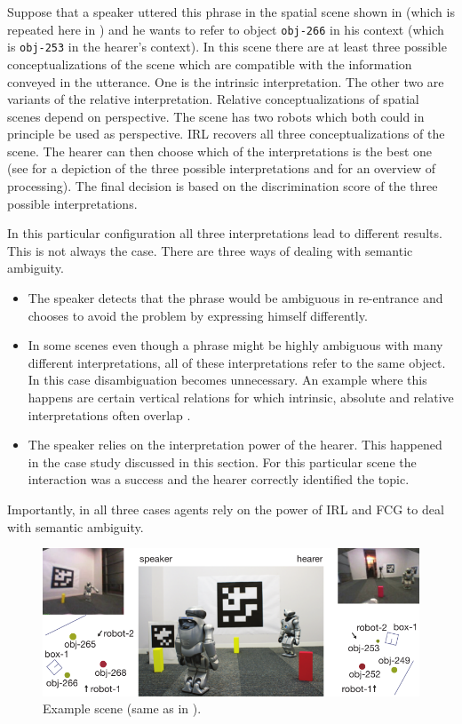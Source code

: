 Suppose that a speaker uttered this phrase in the spatial scene 
shown in  (which is repeated here in ) and he wants to refer to object {\footnotesize\tt obj-266} in his context (which
is {\footnotesize\tt obj-253} in the hearer's context). 
In this scene there are at least three possible conceptualizations of the
scene which are compatible with the information conveyed in the utterance. 
One is the intrinsic interpretation. The other two are variants of the relative
interpretation. Relative conceptualizations of spatial scenes depend on perspective.
The scene has two robots which both could in principle be used as perspective.
IRL recovers all three conceptualizations of the scene. The hearer can then
choose which of the interpretations is the best one (see  for a
depiction of the three possible interpretations and  for
an overview of processing). The final decision is based 
on the discrimination score of the three possible interpretations.

In this particular configuration all three interpretations lead 
to different results. This is not always the case. There are three 
ways of dealing with semantic ambiguity.
\begin{itemize}
\item The speaker detects that the phrase would be ambiguous in re-entrance and 
chooses to avoid the problem by expressing himself differently.
\item  In some scenes even though a phrase might be highly ambiguous with 
many different interpretations, all of these interpretations refer to the same object.
In this case disambiguation becomes unnecessary. An example where this happens
are certain vertical relations for which intrinsic, absolute and 
relative interpretations often overlap
\citep{carlson1999selecting}.
\item The speaker relies on the interpretation power of the hearer. This happened in
the case study discussed in this section. For this particular scene the interaction was
a success and the hearer correctly identified the topic.
\end{itemize}
Importantly, in all three cases agents rely on the power of IRL and FCG 
to deal with semantic ambiguity.


\begin{figure}[p]
\begin{center}
\includegraphics[width=0.8\columnwidth]{figs/space-scene-2-small}
\end{center}
\caption[Example scene]{Example scene (same as in ).}
\label{f:scene-repeated}
\end{figure}

